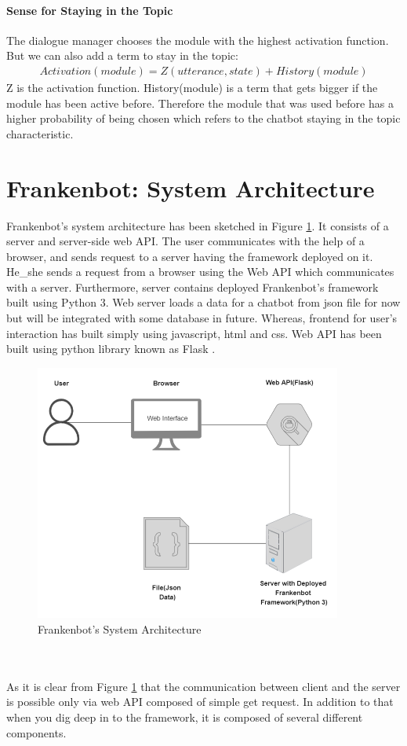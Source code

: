 \paragraph*{Sense for Staying in the Topic}
The dialogue manager chooses the module with the highest activation function. But we can also add a term to stay in the topic: 
\begin{align*}
 Activation(module) = Z(utterance, state) + History(module)
\end{align*} 
Z is the activation function. History(module) is a term that gets bigger if the module has been active before. Therefore the module that was used before has a higher probability of being chosen which refers to the chatbot staying in the topic characteristic.

\section{Frankenbot: System Architecture}
Frankenbot’s system architecture has been sketched in Figure \ref{fig:sysArch}. It consists of a server and server-side web API. The user communicates with the help of a browser, and sends request to a server having the framework deployed on it. He\_she sends a request from a browser using the Web API which communicates with a server. Furthermore, server contains deployed Frankenbot's framework built using Python 3. Web server loads a data for a chatbot from json file for now but will be integrated with some database in future. Whereas, frontend for user's interaction has built simply using javascript, html and css. Web API has been built using python library known as Flask \cite{flask}. 

\begin{figure}[!h]
    \centering
    \includegraphics[width=0.9\textwidth]{img/System_Architecture_Updated.PNG}
    \caption{Frankenbot's System Architecture}
    \label{fig:sysArch}
\end{figure} 
\\~\\
As it is clear from Figure \ref{fig:sysArch} that the communication between client and the server is possible only via web API composed of simple get request. In addition to that when you dig deep in to the framework, it is composed of several different components.

